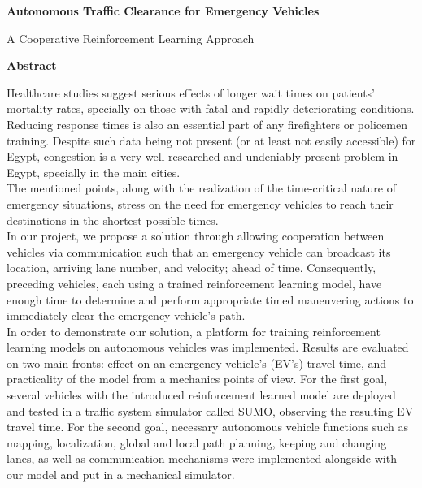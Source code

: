 



\thispagestyle{plain}
\begin{center}

    \Large
    \textbf{Autonomous Traffic Clearance for Emergency Vehicles}
    
    \vspace{0.4cm}
    \large
    A Cooperative Reinforcement Learning Approach
    
    \vspace{0.4cm}
    
    \vspace{0.9cm}
    \textbf{Abstract}
\end{center}

Healthcare studies suggest serious effects of longer wait times on patients' mortality rates\cite{waitTimeMortality}, specially on those with fatal and rapidly deteriorating conditions. Reducing response times is also an essential part of any firefighters or policemen training\cite{policeResponseTime}. Despite such data being not present (or at least not easily accessible) for Egypt, congestion is a very-well-researched and undeniably present problem in Egypt\cite{EgyptCongestion}, specially in the main cities.\\
The mentioned points, along with the realization of the time-critical nature of emergency situations, stress on the need for emergency vehicles to reach their destinations in the shortest possible times.
\\
In our project, we propose a solution through allowing cooperation between vehicles via communication such that an emergency vehicle can broadcast its location, arriving lane number, and velocity; ahead of time. Consequently, preceding vehicles, each using a trained reinforcement learning model, have enough time to determine and perform appropriate timed maneuvering actions to immediately clear the emergency vehicle's path. 
\\
In order to demonstrate our solution, a platform for training reinforcement learning models on autonomous vehicles was implemented. Results are evaluated on two main fronts: effect on an emergency vehicle's (EV's) travel time, and practicality of the model from a mechanics points of view. For the first goal, several vehicles with the introduced reinforcement learned model are deployed and tested in a traffic system simulator called SUMO\cite{sumomain}, observing the resulting EV travel time. For the second goal,  necessary autonomous vehicle functions such as mapping, localization, global and local path planning, keeping and changing lanes, as well as communication mechanisms were implemented alongside with our model and put in a mechanical simulator. 
